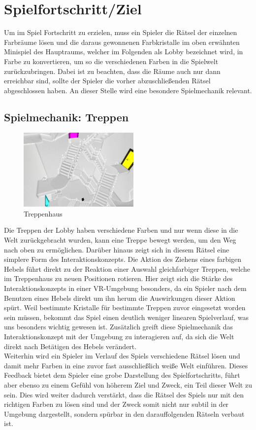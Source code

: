 \section{Spielfortschritt/Ziel}
Um im Spiel Fortschritt zu erzielen, muss ein Spieler die Rätsel der einzelnen Farbräume lösen und die daraus gewonnenen Farbkristalle im oben erwähnten Minispiel des Hauptraums, welcher im Folgenden als Lobby bezeichnet wird, in Farbe zu konvertieren, um so die verschiedenen Farben in die Spielwelt zurückzubringen.
Dabei ist zu beachten, dass die Räume auch nur dann erreichbar sind, sollte der Spieler die vorher abzuschließenden Rätsel abgeschlossen haben. An dieser Stelle wird eine besondere Spielmechanik relevant.
\subsection{Spielmechanik: Treppen}
\begin{figure}
	\vspace*{-0.5cm}
	\includegraphics[width=5.9cm]{Pictures/Treppenhaus}
	\caption{Treppenhaus}
	\vspace*{-0.5cm}
	\label{fig:treppenhaus}
\end{figure}
Die Treppen der Lobby haben verschiedene Farben und nur wenn diese in die Welt zurückgebracht wurden, kann eine Treppe bewegt werden, um den Weg nach oben zu ermöglichen. Darüber hinaus zeigt sich in diesem Rätsel eine simplere Form des Interaktionskonzepts. Die Aktion des Ziehens eines farbigen Hebels führt direkt zu der Reaktion einer Auswahl gleichfarbiger Treppen, welche im Treppenhaus zu neuen Positionen rotieren. Hier zeigt sich die Stärke des Interaktionskonzepts in einer VR-Umgebung besonders, da ein Spieler nach dem Benutzen eines Hebels direkt um ihn herum die Auswirkungen dieser Aktion spürt. Weil bestimmte Kristalle für bestimmte Treppen zuvor eingesetzt worden sein müssen, bekommt das Spiel einen deutlich weniger linearen Spielverlauf, was uns besonders wichtig gewesen ist. Zusätzlich greift diese Spielmechanik das Interaktionskonzept mit der Umgebung zu interagieren auf, da sich die Welt direkt nach Betätigen des Hebels verändert.\\
\noindent Weiterhin wird ein Spieler im Verlauf des Spiels verschiedene Rätsel lösen und damit mehr Farben in eine zuvor fast ausschließlich weiße Welt einführen. Dieses Feedback bietet dem Spieler eine grobe Darstellung des Spielfortschritts, führt aber ebenso zu einem Gefühl von höherem Ziel und Zweck, ein Teil dieser Welt zu sein. Dies wird weiter dadurch verstärkt, dass die Rätsel des Spiels nur mit den richtigen Farben zu lösen sind und der Zweck somit nicht nur subtil in der Umgebung dargestellt, sondern spürbar in den darauffolgenden Rätseln verbaut ist.\newpage \noindent
